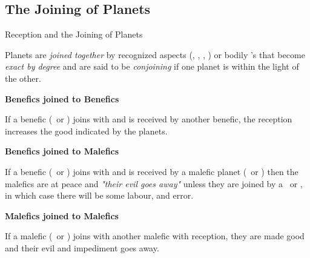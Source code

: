 \subsection{The Joining of Planets}
\begin{frame}[t]{Reception and the Joining of Planets}
\begin{block}{}
 Planets are \textsl{joined together} by recognized aspects (\Sextile, \Square, \Trine, \Opposition) or bodily \Conjunction's that become \textsl{exact by degree} and are said to be \textsl{conjoining} if one planet is within the light of the other.\footnotemark[1]
 \end{block}
\textbf{Benefics joined to Benefics}\footnotemark[2]

If a benefic (\Venus\ or \Jupiter) joins with and is received by another benefic, the reception increases the good indicated by the planets.

\textbf{Benefics joined to Malefics}

If a benefic (\Venus\ or \Jupiter) joins with and is received by a malefic planet (\Mars\ or \Saturn) then the malefics are at peace and \textsl{"their evil goes away"} unless they are joined by a \Square\ or \Opposition, in which case there will be some labour, and error.

\textbf{Malefics joined to Malefics}

If a malefic (\Mars\ or \Saturn) joins with another malefic with reception, they are made good and their evil and impediment goes away.
\vspace{0.5cm}

\end{frame}